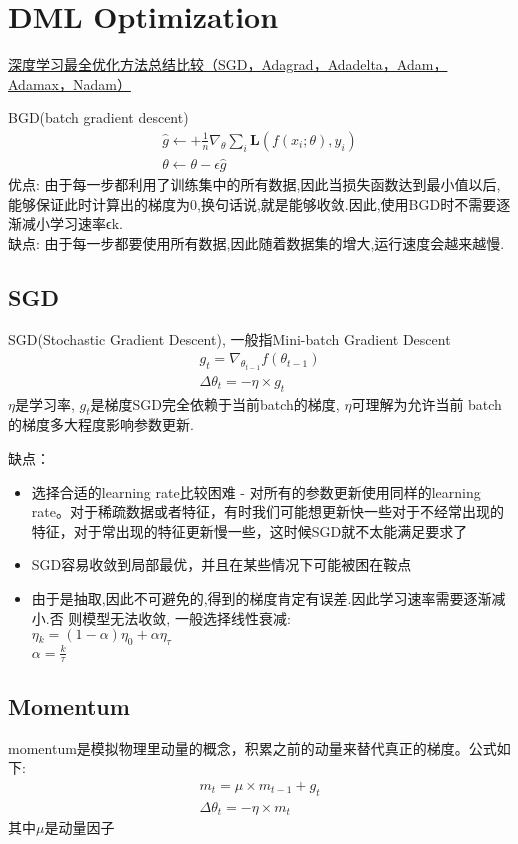\section{DML Optimization}
\setcounter{equation}{0}
\setcounter{theorem}{0}
\setcounter{algorithm}{0}
\setcounter{figure}{0}
\setcounter{table}{0}
\href{https://zhuanlan.zhihu.com/p/22252270}{深度学习最全优化方法总结比较（SGD，Adagrad，Adadelta，Adam，Adamax，Nadam）}

BGD(batch gradient descent)
\begin{eqnarray*}
  \hat{g} \leftarrow + \frac{1}{n} \nabla_{\theta}\sum_i
  \mathbf{L}(f(x_i;\theta),y_i) \\
  \theta \leftarrow \theta - \epsilon \hat{g}
\end{eqnarray*}
优点: 由于每一步都利用了训练集中的所有数据,因此当损失函数达到最小值以后,能够保证此时计算出的梯度为0,换句话说,就是能够收敛.因此,使用BGD时不需要逐渐减小学习速率ϵk. \\
缺点: 由于每一步都要使用所有数据,因此随着数据集的增大,运行速度会越来越慢.
\subsection{SGD}
SGD(Stochastic Gradient Descent), 一般指Mini-batch Gradient Descent
\begin{eqnarray*}
  g_t = \nabla_{\theta_{t-1}}f(\theta_{t-1})  \\
  \Delta{\theta_t} = -\eta\times g_t
\end{eqnarray*}
$\eta$是学习率, $g_t$是梯度SGD完全依赖于当前batch的梯度, $\eta$可理解为允许当前
batch的梯度多大程度影响参数更新.

缺点：
\begin{itemize}
\item 选择合适的learning rate比较困难 - 对所有的参数更新使用同样的learning rate。对于稀疏数据或者特征，有时我们可能想更新快一些对于不经常出现的特征，对于常出现的特征更新慢一些，这时候SGD就不太能满足要求了
\item SGD容易收敛到局部最优，并且在某些情况下可能被困在鞍点
\item 由于是抽取,因此不可避免的,得到的梯度肯定有误差.因此学习速率需要逐渐减小.否
  则模型无法收敛, 一般选择线性衰减:  \\ $\eta{_k}=(1−\alpha)\eta_0+\alpha\eta_{\tau}$  \\
  $\alpha=\frac{k}{\tau}$
\end{itemize}

\subsection{Momentum}
momentum是模拟物理里动量的概念，积累之前的动量来替代真正的梯度。公式如下:
\begin{eqnarray*}
  m_t = \mu \times m_{t-1} + g_t  \\
  \Delta\theta_t = -\eta \times m_t
\end{eqnarray*}
其中$\mu$是动量因子

